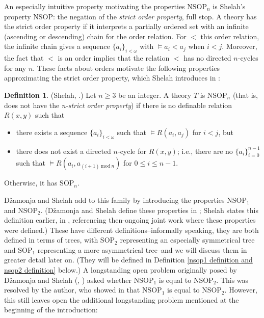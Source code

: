 \documentclass{amsart}
\theoremstyle{definition}
\newtheorem{definition}[theorem]{Definition}
\theoremstyle{remark}
\numberwithin{equation}{section}
\begin{document}
An especially intuitive property motivating the properties $\mathrm{NSOP}_{n}$ is Shelah's property $\mathrm{NSOP}$: the negation of the \textit{strict order property}, full stop. A theory has the strict order property if it interprets a partially ordered set with an infinite (ascending or descending) chain for the order relation. For $<$ this order relation, the infinite chain gives a sequence $\{a_i\}_{i < \omega}$ with $\models a_{i}  < a_{j}$ when $i < j$. Moreover, the fact that $<$ is an order implies that the relation $<$ has no directed $n$-cycles for any $n$. These facts about orders motivate the following properties approximating the strict order property, which Shelah introduces in \cite{She95}:

\begin{definition}\label{integer-valued hierarchy}(Shelah, \cite{She95}.)
Let $n \geq 3$ be an integer. A theory $T$ is $\mathrm{NSOP}_{n}$ (that is, does not have the \emph{n-strict order property}) if there is no definable relation $R(x, y)$ such that

\begin{itemize}
    \item there exists a sequence $\{a_{i}\}_{i < \omega}$ such that $\models R(a_{i}, a_{j})$ for $i <j$, but

    \item there does not exist a directed $n$-cycle for $R(x, y)$; i.e., there are no $\{a_{i}\}^{n-1}_{i = 0}$ such that $\models R(a_{i}, a_{(i+1)\: \mathrm{mod}\: n}) $ for $0 \leq i \leq n-1$.
\end{itemize}
 Otherwise, it has $\mathrm{SOP}_{n}$.
\end{definition}

Džamonja and Shelah add to this family by introducing the properties $\mathrm{NSOP}_{1}$ and $\mathrm{NSOP}_{2}$.  (Džamonja and Shelah define these properties in \cite{DS04}; Shelah states this definition earlier, in \cite{Sh99}, referencing then-ongoing joint work where these properties were defined.) These have different definitions--informally speaking, they are both defined in terms of trees, with $\mathrm{SOP}_{2}$ representing an especially symmetrical tree and $\mathrm{SOP}_{1}$ representing a more asymmetrical tree--and we will discuss them in greater detail later on. (They will be defined in Definition \ref{nsop1 definition and nsop2 definition} below.) A longstanding open problem originally posed by Džamonja and Shelah (\cite{Sh99}, \cite{DS04}) asked whether $\mathrm{NSOP}_{1}$ is equal to $\mathrm{NSOP}_{2}$. This was resolved by the author, who showed in \cite{NSOP2} that $\mathrm{NSOP}_{1}$ is equal to $\mathrm{NSOP}_{2}$. However, this still leaves open the additional longstanding problem mentioned at the beginning of the introduction:
\end{document}

